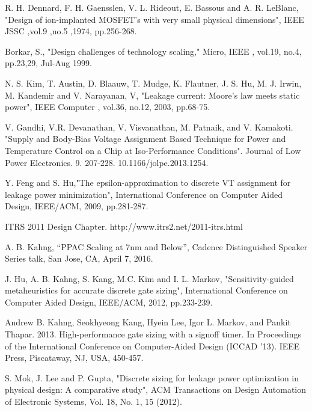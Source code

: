 \begin{thebibliography}{1}
R. H. Dennard, F. H. Gaensslen, V. L. Rideout, E. Bassous and A. R. LeBlanc, "Design of ion-implanted MOSFET's with very small physical dimensions", IEEE JSSC ,vol.9 ,no.5 ,1974, pp.256-268.

Borkar, S., "Design challenges of technology scaling," Micro, IEEE , vol.19, no.4, pp.23,29, Jul-Aug 1999.

N. S. Kim, T. Austin, D. Blaauw, T. Mudge, K. Flautner, J. S. Hu, M. J. Irwin, M. Kandemir and V. Narayanan, V, "Leakage current: Moore's law meets static power", IEEE Computer , vol.36, no.12, 2003, pp.68-75.


V. Gandhi, V.R. Devanathan, V. Visvanathan, M. Patnaik, and V. Kamakoti. "Supply and Body-Bias Voltage Assignment Based Technique for Power and Temperature Control on a Chip at Iso-Performance Conditions". Journal of Low Power Electronics. 9. 207-228. 10.1166/jolpe.2013.1254. 

Y. Feng and S. Hu,"The epsilon-approximation to discrete VT assignment for leakage power minimization", International Conference on Computer Aided Design, IEEE/ACM, 2009, pp.281-287.

ITRS 2011 Design Chapter. http://www.itrs2.net/2011-itrs.html

A. B. Kahng, “PPAC Scaling at 7nm and Below”, Cadence Distinguished Speaker Series talk, San Jose, CA, April 7, 2016.

J. Hu, A. B. Kahng, S. Kang, M.C. Kim and I. L. Markov, "Sensitivity-guided metaheuristics for accurate discrete gate sizing", International Conference on Computer Aided Design, IEEE/ACM, 2012, pp.233-239.

 Andrew B. Kahng, Seokhyeong Kang, Hyein Lee, Igor L. Markov, and Pankit Thapar. 2013. High-performance gate sizing with a signoff timer. In Proceedings of the International Conference on Computer-Aided Design (ICCAD '13). IEEE Press, Piscataway, NJ, USA, 450-457. 

S. Mok, J. Lee and P. Gupta, "Discrete sizing for leakage power optimization in physical design: A comparative study", ACM Transactions on Design Automation of Electronic Systems, Vol. 18, No. 1, 15 (2012).


\end{thebibliography}
